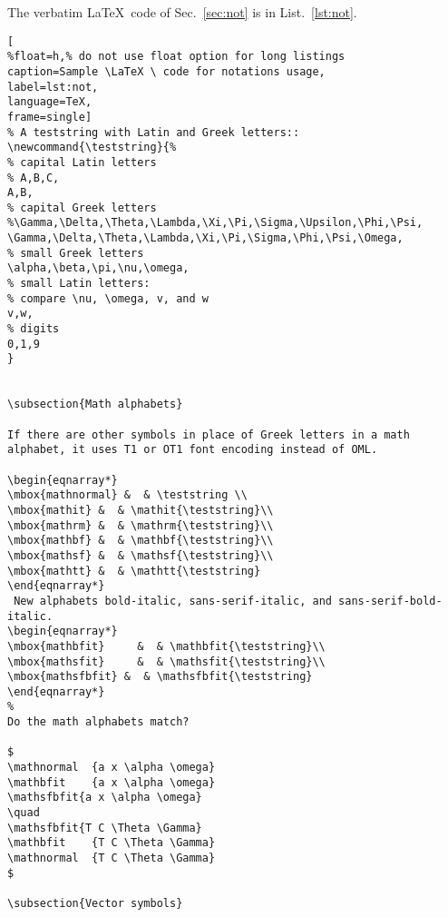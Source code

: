 \newpage
The verbatim \LaTeX \ code of Sec.~\ref{sec:not} is in List.~\ref{lst:not}.

\begin{lstlisting}[
%float=h,% do not use float option for long listings
caption=Sample \LaTeX \ code for notations usage, 
label=lst:not,
language=TeX,
frame=single]
% A teststring with Latin and Greek letters::
\newcommand{\teststring}{%
% capital Latin letters
% A,B,C,
A,B,
% capital Greek letters
%\Gamma,\Delta,\Theta,\Lambda,\Xi,\Pi,\Sigma,\Upsilon,\Phi,\Psi,
\Gamma,\Delta,\Theta,\Lambda,\Xi,\Pi,\Sigma,\Phi,\Psi,\Omega,
% small Greek letters
\alpha,\beta,\pi,\nu,\omega,
% small Latin letters:
% compare \nu, \omega, v, and w
v,w,
% digits
0,1,9
}


\subsection{Math alphabets}

If there are other symbols in place of Greek letters in a math
alphabet, it uses T1 or OT1 font encoding instead of OML.

\begin{eqnarray*}
\mbox{mathnormal} &  & \teststring \\
\mbox{mathit} &  & \mathit{\teststring}\\
\mbox{mathrm} &  & \mathrm{\teststring}\\
\mbox{mathbf} &  & \mathbf{\teststring}\\
\mbox{mathsf} &  & \mathsf{\teststring}\\
\mbox{mathtt} &  & \mathtt{\teststring}
\end{eqnarray*}
 New alphabets bold-italic, sans-serif-italic, and sans-serif-bold-italic.
\begin{eqnarray*}
\mbox{mathbfit}     &  & \mathbfit{\teststring}\\
\mbox{mathsfit}     &  & \mathsfit{\teststring}\\
\mbox{mathsfbfit} &  & \mathsfbfit{\teststring}
\end{eqnarray*}
%
Do the math alphabets match?

$
\mathnormal  {a x \alpha \omega}
\mathbfit    {a x \alpha \omega}
\mathsfbfit{a x \alpha \omega}
\quad
\mathsfbfit{T C \Theta \Gamma}
\mathbfit    {T C \Theta \Gamma}
\mathnormal  {T C \Theta \Gamma}
$

\subsection{Vector symbols}


\end{lstlisting}
